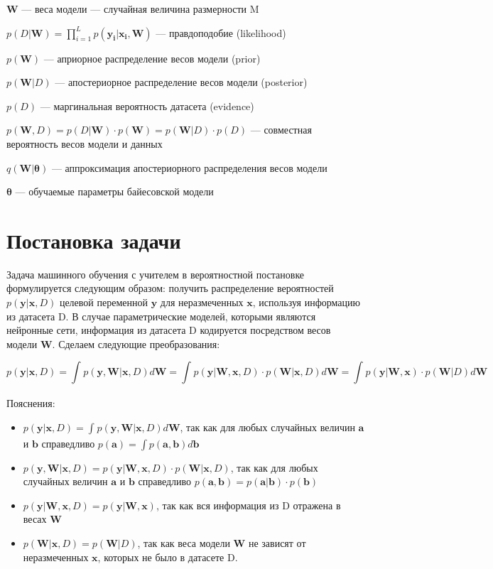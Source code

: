 \documentclass{article}
\begin{document}
$\mathbf{W}$ --- веса модели --- случайная величина размерности M

$p(D | \mathbf{W}) = \prod_{i=1}^{L} p(\mathbf{y_i} | \mathbf{x_i}, \mathbf{W})$ — правдоподобие (likelihood)

$p(\mathbf{W})$ --- априорное распределение весов модели (prior)

$p(\mathbf{W}| D)$ --- апостериорное распределение весов модели (posterior)

$p(D)$ --- маргинальная вероятность датасета (evidence)

$p(\mathbf{W}, D) =
p(D | \mathbf{W}) \cdot p(\mathbf{W}) =
p(\mathbf{W}| D)\cdot p(D)$
--- совместная вероятность весов модели и данных

$q(\mathbf{W} | \pmb{\theta})$ --- аппроксимация апостериорного распределения весов модели

$\pmb{\theta}$ --- обучаемые параметры байесовской модели


\section{Постановка задачи}

Задача машинного обучения с учителем в вероятностной постановке формулируется следующим образом:
получить распределение вероятностей $p(\mathbf{y} | \mathbf{x}, D)$ целевой переменной $\mathbf{y}$
для неразмеченных $\mathbf{x}$, используя информацию из датасета D. В случае параметрические моделей, которыми являются нейронные сети,
информация из датасета D кодируется посредством весов модели $\mathbf{W}$. Сделаем следующие преобразования:

\[
p(\mathbf{y} | \mathbf{x}, D) =
\int_{}{} p(\mathbf{y}, \mathbf{W} | \mathbf{x}, D) d\mathbf{W} =
\int_{}{} p(\mathbf{y} | \mathbf{W}, \mathbf{x}, D) \cdot p(\mathbf{W} | \mathbf{x}, D) d\mathbf{W} =
\int_{}{} p(\mathbf{y} | \mathbf{W}, \mathbf{x}) \cdot p(\mathbf{W} | D) d\mathbf{W}
\]

Пояснения:
\begin{itemize}
 \item $p(\mathbf{y} | \mathbf{x}, D) = \int_{}{} p(\mathbf{y}, \mathbf{W} | \mathbf{x}, D) d\mathbf{W}$,
 так как для любых случайных величин $\mathbf{a}$ и $\mathbf{b}$ справедливо $p(\mathbf{a}) = \int p(\mathbf{a}, \mathbf{b}) d\mathbf{b}$
 \item $p(\mathbf{y}, \mathbf{W} | \mathbf{x}, D) = p(\mathbf{y} | \mathbf{W}, \mathbf{x}, D) \cdot p(\mathbf{W} | \mathbf{x}, D)$,
 так как для любых случайных величин $\mathbf{a}$ и $\mathbf{b}$ справедливо $p(\mathbf{a}, \mathbf{b}) = p(\mathbf{a}| \mathbf{b}) \cdot p(\mathbf{b})$
 \item $p(\mathbf{y} | \mathbf{W}, \mathbf{x}, D) = p(\mathbf{y} | \mathbf{W}, \mathbf{x})$, так как вся информация из D отражена в весах $\mathbf{W}$
 \item $p(\mathbf{W} | \mathbf{x}, D) = p(\mathbf{W} | D)$, так как веса модели $\mathbf{W}$ не зависят от неразмеченных $\mathbf{x}$, которых не было в датасете D.
\end{itemize}
\end{document}
